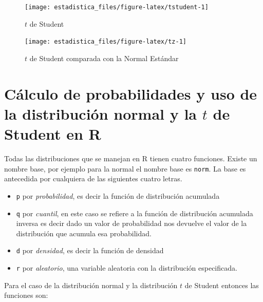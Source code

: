\documentclass[]{book}
\providecommand{\tightlist}{%
  \setlength{\itemsep}{0pt}\setlength{\parskip}{0pt}}
\begin{document}
\begin{figure}[h!]

{\centering \texttt{[image: estadistica\_files/figure-latex/tstudent-1]} 

}

\caption{$t$ de Student}\label{fig:tstudent}
\end{figure}

\begin{figure}[h!]

{\centering \texttt{[image: estadistica\_files/figure-latex/tz-1]} 

}

\caption{$t$ de Student comparada con la Normal Estándar}\label{fig:tz}
\end{figure}

\hypertarget{calculo-de-probabilidades-y-uso-de-la-distribucion-normal-y-la-t-de-student-en-r}{%
\section{\texorpdfstring{Cálculo de probabilidades y uso de la distribución normal y la \(t\) de Student en R}{Cálculo de probabilidades y uso de la distribución normal y la t de Student en R}}\label{calculo-de-probabilidades-y-uso-de-la-distribucion-normal-y-la-t-de-student-en-r}}

Todas las distribuciones que se manejan en R tienen cuatro funciones. Existe un nombre base, por ejemplo para la normal el nombre base es \texttt{norm}. La base es antecedida por cualquiera de las siguientes cuatro letras.

\begin{itemize}
\tightlist
\item
  \texttt{p} por \emph{probabilidad}, es decir la función de distribución acumulada
\item
  \texttt{q} por \emph{cuantil}, en este caso se refiere a la función de distribución acumulada inversa es decir dado un valor de probabilidad nos devuelve el valor de la distribución que acumula esa probabilidad.
\item
  \texttt{d} por \emph{densidad}, es decir la función de densidad
\item
  \texttt{r} por \emph{aleatorio}, una variable aleatoria con la distribución especificada.
\end{itemize}

Para el caso de la distribución normal y la distribución \(t\) de Student entonces las funciones son:
\end{document}
